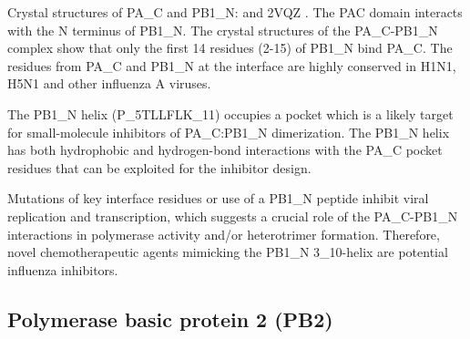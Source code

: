 Crystal structures of PA_C and PB1_N: \citep{1540} and 2VQZ \citep{1141}. The PAC domain interacts with the N terminus of PB1_N. The crystal structures of the PA_C-PB1_N complex show that only the first 14 residues (2-15) of PB1_N bind PA_C. The residues from PA_C and PB1_N at the interface are highly conserved in H1N1, H5N1 and other influenza A viruses.

The PB1_N helix (P_5TLLFLK_11) occupies a pocket which is a likely target for small-molecule inhibitors of PA_C:PB1_N dimerization. The PB1_N helix has both hydrophobic and hydrogen-bond interactions with the PA_C pocket residues that can be exploited for the inhibitor design.

Mutations of key interface residues or use of a PB1_N peptide inhibit viral replication and transcription, which suggests a crucial role of the PA_C-PB1_N interactions in polymerase activity and/or heterotrimer formation. Therefore, novel chemotherapeutic agents mimicking the PB1_N 3_10-helix are potential influenza inhibitors.

\subsection{Polymerase basic protein 2 (PB2)}


